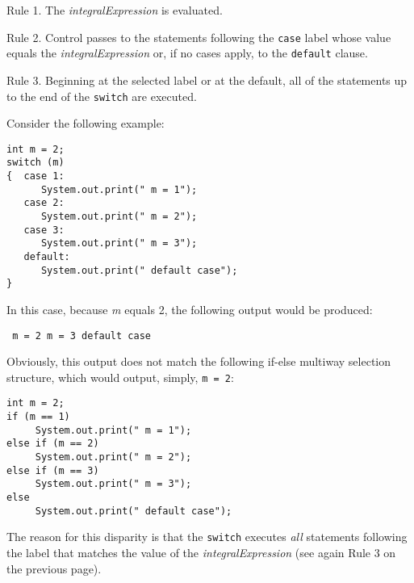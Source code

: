 \begin{NL}
\item[Rule 1.]  The {\it integralExpression} is evaluated.
\vspace*{6pt}
\item[Rule 2.]  Control passes to the statements following the {\tt case}
label whose value equals the {\it integralExpression} or,
if no cases apply, to the {\tt default} clause.
\vspace*{6pt}

\item[Rule 3.]  Beginning at the selected label or at the default, all
of the statements up to the end of the {\tt switch} are executed.
\end{NL}

\noindent Consider the following example:

\begin{jjjlisting}
\begin{lstlisting}
int m = 2;
switch (m)
{  case 1:
      System.out.print(" m = 1");
   case 2:
      System.out.print(" m = 2");
   case 3:
      System.out.print(" m = 3");
   default:
      System.out.print(" default case");
}
\end{lstlisting}
\end{jjjlisting}

\noindent In this case, because {\it m} equals 2, the following output
would be produced:

\begin{jjjlisting}
\begin{lstlisting}
 m = 2 m = 3 default case
\end{lstlisting}
\end{jjjlisting}

\noindent Obviously, this output does not match
the following if-else multiway selection
structure, which would output,
simply, {\tt m = 2}:


\begin{jjjlisting}
\begin{lstlisting}
int m = 2;
if (m == 1)
     System.out.print(" m = 1");
else if (m == 2)
     System.out.print(" m = 2");
else if (m == 3)
     System.out.print(" m = 3");
else
     System.out.print(" default case");
\end{lstlisting}
\end{jjjlisting}

\noindent The reason for this disparity is that the {\tt switch}
executes {\it all} statements following the label that matches the
value of the {\it integralExpression} (see again Rule 3 on the
previous page).

